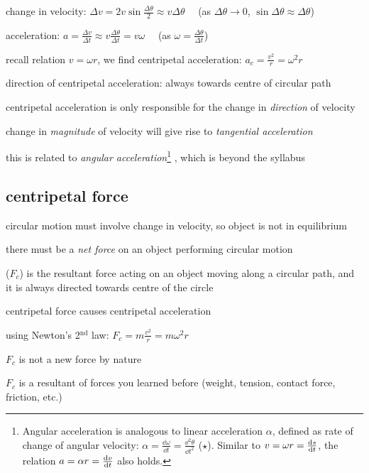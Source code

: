 	change in velocity: $\Delta v = 2v\sin\frac{\Delta \theta}{2} \approx v \Delta \theta \quad$ (as $\Delta \theta \to 0$, $\sin \Delta \theta \approx \Delta \theta$)
	
	acceleration: $a = \frac{\Delta v}{\Delta t} \approx v \frac{\Delta \theta}{\Delta t} = v \omega \quad$ (as $\omega = \frac{\Delta \theta}{\Delta t}$)
	
	recall relation $v = \omega r$, we find centripetal acceleration: $\boxed{a_c = \frac{v^2}{r} = \omega^2 r}$

\cmt direction of centripetal acceleration: always towards centre of circular path
	
\cmt centripetal acceleration is only responsible for the change in \emph{direction} of velocity

change in \emph{magnitude} of velocity will give rise to \emph{tangential acceleration}

this is related to \emph{angular acceleration}\footnote{Angular acceleration is analogous to linear acceleration $\alpha$, defined as rate of change of angular velocity: $\alpha = \frac{\dd \omega}{\dd t} = \frac{\dd^2 \theta}{\dd t^2}$ ($\star$). Similar to $v=\omega r = \frac{\mathrm{d}s}{\mathrm{d}t}$, the relation $a=\alpha r = \frac{\mathrm{d}v}{\mathrm{d}t}$ also holds.}  , which is beyond the syllabus



\subsection{centripetal force}

circular motion must involve change in velocity, so object is not in equilibrium 

there must be a \emph{net force} on an object performing circular motion 

\begin{ilight}
	 ($F_c$) is the resultant force acting on an object
	moving along a circular path, and it is always directed towards centre of the circle
\end{ilight}

\cmt centripetal force causes centripetal acceleration

using Newton's 2$^\text{nd}$ law: $\boxed{ F_c = m\frac{v^2}{r} = m\omega^2r}$

\cmt $F_c$ is not a new force by nature

$F_c$ is a resultant of forces you learned before (weight, tension, contact force, friction, etc.)

